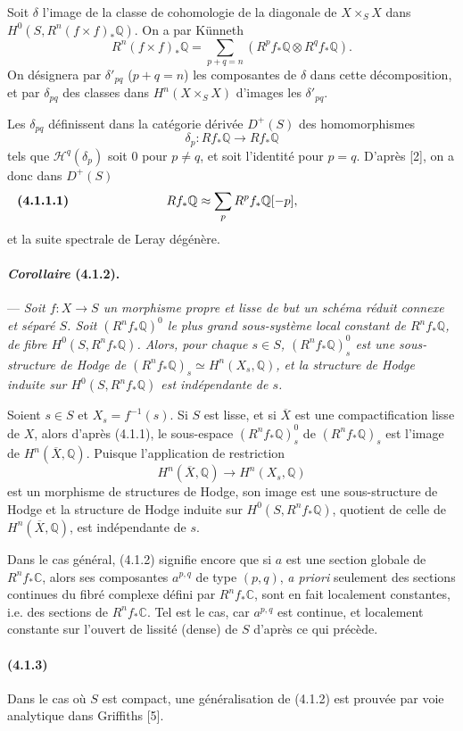 \documentclass[10pt]{article}
\newcommand{\C}{\mathbb C}
\newcommand{\Q}{\mathbb Q}
\begin{document}
Soit $\delta$ l'image de la classe de cohomologie de la diagonale de $X\times_SX$ dans $H^0(S,R^n(f\times f)_*\Q)$. On a par Künneth
\[
R^n(f\times f)_*\Q=
\sum_{p+q=n}(R^pf_*\Q\otimes R^qf_*\Q).
\]
On désignera par $\delta'_{pq}$ ($p+q=n$) les composantes de $\delta$ dans cette décomposition, et par $\delta_{pq}$ des classes dans $H^n(X\times_SX)$ d'images les $\delta'_{pq}$.

Les $\delta_{pq}$ définissent dans la catégorie dérivée $D^+(S)$ des homomorphismes
\[
\delta_p:Rf_*\Q\longrightarrow Rf_*\Q
\]
tels que $\mathcal H^q(\delta_p)$ soit $0$ pour $p\ne q$, et soit l'identité pour $p=q$. D'après [2], on a donc dans $D^+(S)$
\[
\makebox[\textwidth][s]{\textbf{(4.1.1.1)}\hfill$\displaystyle Rf_*\Q\approx\sum_p R^pf_*\Q[-p],$\hfill\phantom{\textbf{(4.1.1.1)}}}
\]
et la suite spectrale de Leray dégénère.

\paragraph{\emph{Corollaire} (4.1.2).} --- {\itshape Soit $f:X\to S$ un morphisme propre et lisse de but un schéma réduit connexe et séparé $S$. Soit $(R^nf_*\Q)^0$ le plus grand sous-système local constant de $R^nf_*\Q$, de fibre $H^0(S,R^nf_*\Q)$. Alors, pour chaque $s\in S$, $(R^nf_*\Q)^0_s$ est une sous-structure de Hodge de $(R^nf_*\Q)_s\simeq H^n(X_s,\Q)$, et la structure de Hodge induite sur $H^0(S,R^nf_*\Q)$ est indépendante de $s$.}

Soient $s\in S$ et $X_s=f^{-1}(s)$. Si $S$ est lisse, et si $\overline X$ est une compactification lisse de $X$, alors d'après (4.1.1), le sous-espace $(R^nf_*\Q)^0_s$ de $(R^nf_*\Q)_s$ est l'image de $H^n(\overline X,\Q)$. Puisque l'application de restriction
\[
H^n(\overline X,\Q)\longrightarrow H^n(X_s,\Q)
\]
est un morphisme de structures de Hodge, son image est une sous-structure de Hodge et la structure de Hodge induite sur $H^0(S,R^nf_*\Q)$, quotient de celle de $H^n(\overline X,\Q)$, est indépendante de $s$.

Dans le cas général, (4.1.2) signifie encore que si $a$ est une section globale de $R^nf_*\C$, alors ses composantes $a^{p,q}$ de type $(p,q)$, \emph{a priori} seulement des sections continues du fibré complexe défini par $R^nf_*\C$, sont en fait localement constantes, i.e. des sections de $R^nf_*\C$. Tel est le cas, car $a^{p,q}$ est continue, et localement constante sur l'ouvert de lissité (dense) de $S$ d'après ce qui précède.

\paragraph{(4.1.3)} Dans le cas où $S$ est compact, une généralisation de (4.1.2) est prouvée par voie analytique dans Griffiths [5].
\end{document}
